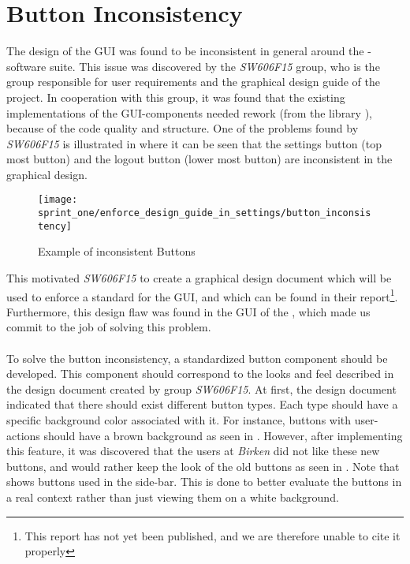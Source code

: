 \section{Button Inconsistency}
\label{sub:button_inconsistency}

The design of the GUI was found to be inconsistent in general around the \giraf-software suite. This issue was discovered by the \emph{SW606F15} group, who is the group responsible for user requirements and the graphical design guide of the project. In cooperation with this group, it was found that the existing implementations of the GUI-components needed rework (from the library \gc), because of the code quality and structure. One of the problems found by \emph{SW606F15} is illustrated in  where it can be seen that the settings button (top most button) and the logout button (lower most button) are inconsistent in the graphical design.

\begin{figure}[!htbp]
    \centering
    \texttt{[image: sprint\_one/enforce\_design\_guide\_in\_settings/button\_inconsistency]}
    \caption{Example of inconsistent Buttons}
    \label{fig:button_inconsistency}
\end{figure}

This motivated \emph{SW606F15} to create a graphical design document which will be used to enforce a standard for the GUI, and which can be found in their report\footnote{This report has not yet been published, and we are therefore unable to cite it properly}. Furthermore, this design flaw was found in the GUI of the \launcher, which made us commit to the job of solving this problem.
\\\\
To solve the button inconsistency, a standardized button component should be developed. This component should correspond to the looks and feel described in the design document created by group \emph{SW606F15}. At first, the design document indicated that there should exist different button types. Each type should have a specific background color associated with it. For instance, buttons with user-actions should have a brown background as seen in . However, after implementing this feature, it was discovered that the users at \emph{Birken} did not like these new buttons, and would rather keep the look of the old buttons as seen in . Note that  shows buttons used in the \launcher side-bar. This is done to better evaluate the buttons in a real context rather than just viewing them on a white background.


